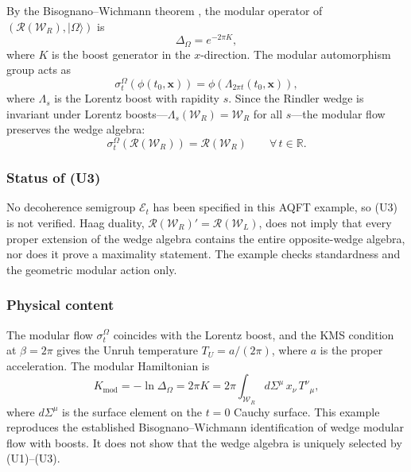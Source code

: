 \documentclass[12pt,a4paper,openany]{book}
\begin{document}
By the Bisognano--Wichmann theorem \cite{BisognanoWichmann1975, BisognanoWichmann1976}, the modular operator of $(\mathcal{R}(\mathcal{W}_R), |\Omega\rangle)$ is
\begin{equation}
\Delta_\Omega = e^{-2\pi K},
\end{equation}
where $K$ is the boost generator in the $x$-direction.
The modular automorphism group acts as
\begin{equation}
\sigma_t^\Omega(\phi(t_0, \mathbf{x})) = \phi(\Lambda_{2\pi t}(t_0, \mathbf{x})),
\end{equation}
where $\Lambda_s$ is the Lorentz boost with rapidity $s$.
Since the Rindler wedge is invariant under Lorentz boosts---$\Lambda_s(\mathcal{W}_R) = \mathcal{W}_R$ for all $s$---the modular flow preserves the wedge algebra:
\begin{equation}
\sigma_t^\Omega(\mathcal{R}(\mathcal{W}_R)) = \mathcal{R}(\mathcal{W}_R) \qquad \forall\, t \in \mathbb{R}.
\end{equation}

\subsubsection{Status of (U3)}

No decoherence semigroup $\mathcal E_t$ has been specified in this AQFT example, so (U3) is not verified.  Haag duality, $\mathcal R(\mathcal W_R)'=\mathcal R(\mathcal W_L)$, does not imply that every proper extension of the wedge algebra contains the entire opposite-wedge algebra, nor does it prove a maximality statement.  The example checks standardness and the geometric modular action only.

\subsubsection{Physical content}

The modular flow $\sigma_t^\Omega$ coincides with the Lorentz boost, and the KMS condition at $\beta = 2\pi$ gives the Unruh temperature $T_U = a/(2\pi)$, where $a$ is the proper acceleration.
The modular Hamiltonian is
\begin{equation}
K_{\mathrm{mod}} = -\ln \Delta_\Omega = 2\pi K = 2\pi \int_{\mathcal{W}_R} d\Sigma^\mu\, x_\nu\, T^{\nu}{}_\mu,
\end{equation}
where $d\Sigma^\mu$ is the surface element on the $t = 0$ Cauchy surface.
This example reproduces the established Bisognano--Wichmann identification of wedge modular flow with boosts.  It does not show that the wedge algebra is uniquely selected by (U1)--(U3).
\end{document}
